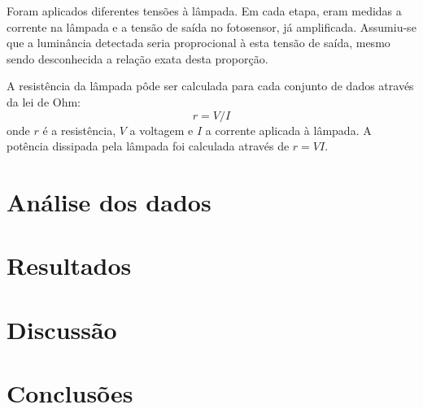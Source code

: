\documentclass[brazilian,12pt,a4paper,final]{article}
\begin{document}
Foram aplicados diferentes tensões à lâmpada.
Em cada etapa, eram medidas a corrente na lâmpada e a tensão de saída no fotosensor, já amplificada.
Assumiu-se que a luminância detectada seria proprocional à esta tensão de saída, mesmo sendo desconhecida 
a relação exata desta proporção.

A resistência da lâmpada pôde ser calculada para cada conjunto de dados através da lei de Ohm: 
$$ r=V/I$$ 
onde $r$ é a resistência, $V$ a voltagem e $I$ a corrente aplicada à lâmpada. 
A potência dissipada pela lâmpada foi calculada através de $ r=VI $.



\section{Análise dos dados}

\section{Resultados}

\section{Discussão}

\section{Conclusões}


\begin{thebibliography}{99}
\end{thebibliography}
\end{document}

